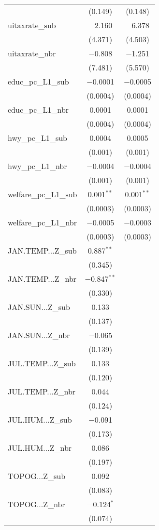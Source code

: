 \begin{table}[!htbp]
\begin{tabular}{@{\extracolsep{5pt}}lcc}
  & (0.149) & (0.148) \\ 
  uitaxrate\_sub & $-$2.160 & $-$6.378 \\ 
  & (4.371) & (4.503) \\ 
  uitaxrate\_nbr & $-$0.808 & $-$1.251 \\ 
  & (7.481) & (5.570) \\ 
  educ\_pc\_L1\_sub & $-$0.0001 & $-$0.0005 \\ 
  & (0.0004) & (0.0004) \\ 
  educ\_pc\_L1\_nbr & 0.0001 & 0.0001 \\ 
  & (0.0004) & (0.0004) \\ 
  hwy\_pc\_L1\_sub & 0.0004 & 0.0005 \\ 
  & (0.001) & (0.001) \\ 
  hwy\_pc\_L1\_nbr & $-$0.0004 & $-$0.0004 \\ 
  & (0.001) & (0.001) \\ 
  welfare\_pc\_L1\_sub & 0.001$^{**}$ & 0.001$^{**}$ \\ 
  & (0.0003) & (0.0003) \\ 
  welfare\_pc\_L1\_nbr & $-$0.0005 & $-$0.0003 \\ 
  & (0.0003) & (0.0003) \\ 
  JAN.TEMP...Z\_sub & 0.887$^{**}$ &  \\ 
  & (0.345) &  \\ 
  JAN.TEMP...Z\_nbr & $-$0.847$^{**}$ &  \\ 
  & (0.330) &  \\ 
  JAN.SUN...Z\_sub & 0.133 &  \\ 
  & (0.137) &  \\ 
  JAN.SUN...Z\_nbr & $-$0.065 &  \\ 
  & (0.139) &  \\ 
  JUL.TEMP...Z\_sub & 0.133 &  \\ 
  & (0.120) &  \\ 
  JUL.TEMP...Z\_nbr & 0.044 &  \\ 
  & (0.124) &  \\ 
  JUL.HUM...Z\_sub & $-$0.091 &  \\ 
  & (0.173) &  \\ 
  JUL.HUM...Z\_nbr & 0.086 &  \\ 
  & (0.197) &  \\ 
  TOPOG...Z\_sub & 0.092 &  \\ 
  & (0.083) &  \\ 
  TOPOG...Z\_nbr & $-$0.124$^{*}$ &  \\ 
  & (0.074) &  \\ 

\end{tabular}
\end{table}
